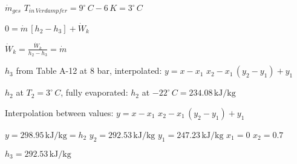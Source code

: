 \( \dot{m}_{ges} \)  
\( T_{in \, Verdampfer} = 9^\circ \, C - 6 \, K = 3^\circ \, C \)  

\( 0 = \dot{m} \, [h_2 - h_3] + \dot{W}_k \)  

\( \dot{W}_k = \frac{\dot{W}_k}{h_2 - h_3} = \dot{m} \)  

\( h_3 \) from Table A-12 at 8 bar, interpolated:  
\( y = x - x_1 \)  
\( x_2 - x_1 \, (y_2 - y_1) + y_1 \)  

\( h_2 \) at \( T_2 = 3^\circ \, C \), fully evaporated:  
\( h_2 \) at \( -22^\circ \, C = 234.08 \, \text{kJ/kg} \)  

Interpolation between values:  
\( y = x - x_1 \)  
\( x_2 - x_1 \, (y_2 - y_1) + y_1 \)  

\( y = 298.95 \, \text{kJ/kg} = h_2 \)  
\( y_2 = 292.53 \, \text{kJ/kg} \)  
\( y_1 = 247.23 \, \text{kJ/kg} \)  
\( x_1 = 0 \)  
\( x_2 = 0.7 \)  

\( h_3 = 292.53 \, \text{kJ/kg} \)